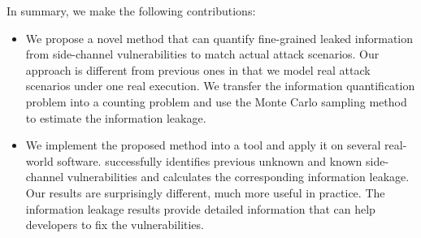 In summary, we make the following contributions:

\begin{itemize}
      \item We propose a novel method that can quantify fine-grained leaked
            information from side-channel vulnerabilities to match actual attack
            scenarios. Our approach is different from previous ones in that we
            model real attack scenarios under one real execution. 
            We transfer the information quantification problem into a counting problem 
            and use the Monte Carlo sampling method to estimate the information leakage.
   
      \item We implement the proposed method into a tool and apply it
            on several real-world software. \tool{} successfully identifies
            previous unknown and known side-channel vulnerabilities and calculates the
            corresponding information leakage. 
            Our results are surprisingly different, much more useful in practice.
            The information leakage results provide detailed information that can 
            help developers to fix the vulnerabilities.
\end{itemize}
